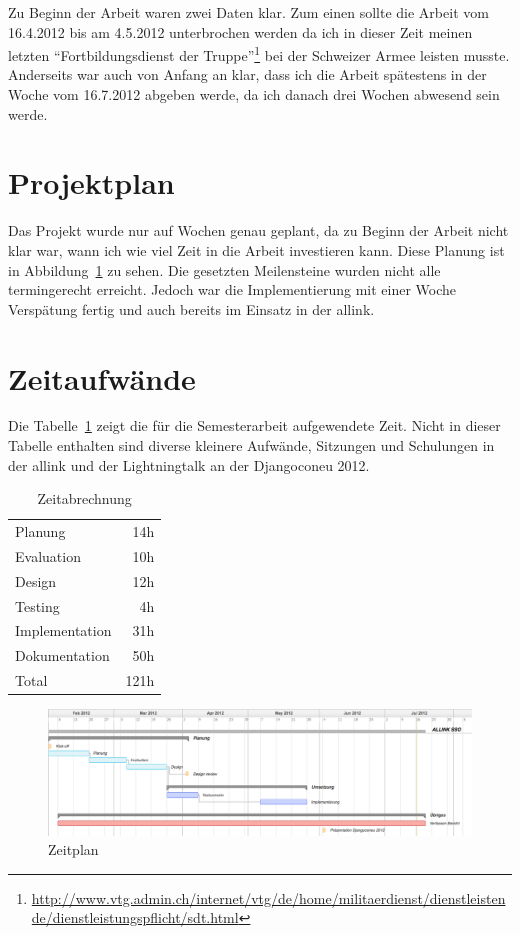 Zu Beginn der Arbeit waren zwei Daten klar. Zum einen sollte die Arbeit vom 16.4.2012 bis am 4.5.2012 unterbrochen werden da ich in dieser Zeit meinen letzten ``Fortbildungsdienst der Truppe''\footnote{\url{http://www.vtg.admin.ch/internet/vtg/de/home/militaerdienst/dienstleistende/dienstleistungspflicht/sdt.html}} bei der Schweizer Armee leisten musste. Anderseits war auch von Anfang an klar, dass ich die Arbeit spätestens in der Woche vom 16.7.2012 abgeben werde, da ich danach drei Wochen abwesend sein werde.

\section{Projektplan}
\label{sec:projektplan}
Das Projekt wurde nur auf Wochen genau geplant, da zu Beginn der Arbeit nicht klar war, wann ich wie viel Zeit in die Arbeit investieren kann. Diese Planung ist in Abbildung~\ref{fig:zeitplan} zu sehen. Die gesetzten Meilensteine wurden nicht alle termingerecht erreicht. Jedoch war die Implementierung mit einer Woche Verspätung fertig und auch bereits im Einsatz in der allink.

\section{Zeitaufwände}
\label{sec:zeitaufwände}
Die Tabelle~\ref{tab:zeitabrechnung} zeigt die für die Semesterarbeit aufgewendete Zeit. Nicht in dieser Tabelle enthalten sind diverse kleinere Aufwände, Sitzungen und Schulungen in der allink und der Lightningtalk an der Djangoconeu 2012.
\begin{table}[ht]
  \centering
  \begin{tabular}{lr}
    Planung & 14h \\
    Evaluation & 10h \\
    Design & 12h \\
    Testing & 4h \\
    Implementation & 31h \\
    Dokumentation & 50h \\
    \hline
    Total & 121h \\
  \end{tabular}
  \caption{Zeitabrechnung}
  \label{tab:zeitabrechnung}
\end{table}

\begin{figure}
  \centering
	\includegraphics[width=21cm, angle=90]{include/zeitplan.png}
	\caption{Zeitplan}
	\label{fig:zeitplan}
\end{figure}
